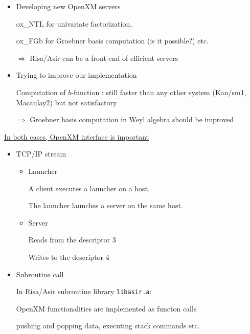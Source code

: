 \begin{slide}{}

\begin{itemize}
\item Developing new OpenXM servers

{ox\_NTL} for univariate factorization, 

{ox\_FGb} for Groebner basis computation (is it possible?) etc.

$\Rightarrow$ Risa/Asir can be a front-end of efficient servers

\item Trying to improve our implementation

Computation of $b$-function : still faster than any other system
(Kan/sm1, Macaulay2) but not satisfactory

$\Rightarrow$ Groebner basis computation in Weyl
algebra should be improved
\end{itemize}

\begin{center}
\underline{In both cases, OpenXM interface is important}
\end{center}
\end{slide}

\begin{slide}{}

\begin{itemize}
\item TCP/IP stream

\begin{itemize}
\item Launcher

A client executes a launcher on a host.

The launcher launches a server on the same host.

\item Server

Reads from the descriptor 3

Writes to the descriptor 4

\end{itemize}

\item Subroutine call

In Risa/Asir subroutine library {\tt libasir.a}:

OpenXM functionalities are implemented as functon calls

pushing and popping data, executing stack commands etc.
\end{itemize}
\end{slide}

